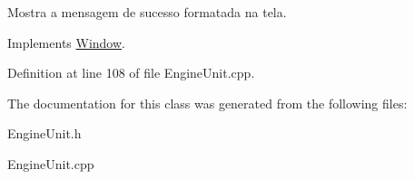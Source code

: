 Mostra a mensagem de sucesso formatada na tela. 



Implements \hyperlink{classWindow_af625e87e68e0510c2fc11f1dc2d42f0e}{Window}.



Definition at line 108 of file Engine\-Unit.\-cpp.



The documentation for this class was generated from the following files\-:\begin{DoxyCompactItemize}
\item 
Engine\-Unit.\-h\item 
Engine\-Unit.\-cpp\end{DoxyCompactItemize}
